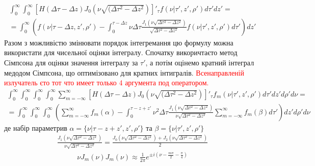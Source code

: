 %
\begin{equation*} \begin{aligned}
\int_0^\infty \int_0^\infty \left[ H(\Delta \tau - \Delta z) 
J_0 \left( \nu \sqrt{(\Delta \tau^2 - \Delta z^2} \right) 
\right]'_\tau f(\nu | \tau',z',\rho') d \tau' dz' = \\
= \int_0^\infty \left( f(\nu | \tau - \Delta z,z',\rho') - 
\int_0^{\tau - \Delta z} \nu \Delta \tau 
\frac{J_1 \left( \nu \sqrt{\Delta \tau^2 - \Delta z^2} \right)}
{\sqrt{\Delta \tau^2 - \Delta z^2}} 
f(\nu | \tau',z',\rho') d \tau' \right) dz'
\end{aligned} \end{equation*}
%
Разом з можливістю змінювати порядок інтегремання цю формулу можна 
використати для чисельної оцінки інтегралу. Спочатку викоричтаєто метод 
Сімпсона для оцінки значення інтегралу за $ \tau' $, а потім оцінемо 
кратний інтеграл медодом Сімпсона, що оптимізовано для кратних інтигралів.
%
\textcolor{red} { Всенаправленій излучатель єто тот что имеет только 4 
аргумента под оператором. }
%
\begin{equation*} \begin{aligned}
\int_0^\infty \int_0^\infty \int_0^\infty \int_0^\infty 
\sum_{m=-\infty}^\infty \left[ H(\Delta \tau - \Delta z) 
J_0 \left( \nu \sqrt{(\Delta \tau^2 - \Delta z^2} \right) 
\right]'_\tau f_m (\nu | \tau',z',\rho') d \tau' dz' d \rho' d \nu = \\
= \int_0^\infty \int_0^\infty \int_0^\infty
\left( \sum_{m=-\infty}^\infty f_m (\alpha) - 
\int_0^{\tau - z + z'} \nu^2 \Delta \tau 
\frac{J_1 \left( \nu \sqrt{\Delta \tau^2 - \Delta z^2} \right)}
{\nu \sqrt{\Delta \tau^2 - \Delta z^2}} 
\sum_{m=-\infty}^\infty f_m (\beta) d \tau' \right) dz' d \rho' d \nu
\end{aligned} \end{equation*}
%
де набір параметрив $ \alpha = \{ \nu | \tau-z+z', z', \rho' \} $ та 
$ \beta = \{ \nu | \tau', z', \rho' \} $
%
\begin{equation*} \begin{aligned}
\frac{J_1 \left( \nu \sqrt{\Delta \tau^2 - \Delta z^2} \right)}
{\nu \sqrt{\Delta \tau^2 - \Delta z^2}} =
\frac{J_0 \left( \nu \sqrt{\Delta \tau^2 - \Delta z^2} \right) +
J_2 \left( \nu \sqrt{\Delta \tau^2 - \Delta z^2} \right)}{2}
\end{aligned} \end{equation*}
%
\begin{equation*} \begin{aligned}
\nu J_m (\nu) J_m (\nu) \approx \frac{1}{2\pi} 
e^{\pm i \left( \nu - \frac{m\pi}{2} - \frac{\pi}{4} \right)}
\end{aligned} \end{equation*}
